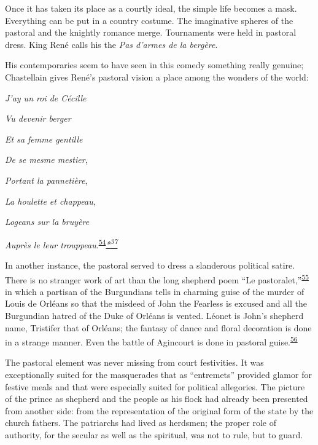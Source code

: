 Once it has taken its place as a courtly ideal, the simple life becomes
a mask. Everything can be put in a country costume. The imaginative
spheres of the pastoral and the knightly romance merge. Tournaments were
held in pastoral dress. King René calls his the \emph{Pas d'armes de la
bergère}.

His contemporaries seem to have seen in this comedy something really
genuine; Chastellain gives René's pastoral vision a place among the
wonders of the world:

\emph{J'ay un roi de Cécille}

\emph{Vu devenir berger}

\emph{\protect\hypertarget{11_Chapter_Four__THE_FORMS_OF_LOVE.xhtmlux5cux23page_152}{}{}Et
sa femme gentille}

\emph{De se mesme mestier},

\emph{Portant la pannetière},

\emph{La houlette et chappeau},

\emph{Logeans sur la bruyère}

\emph{Auprès le leur
trouppeau}.\textsuperscript{\protect\hypertarget{11_Chapter_Four__THE_FORMS_OF_LOVE.xhtmlux5cux23id_1381}{\protect\hyperlink{23_NOTES.xhtmlux5cux23id_1382}{54}}}\emph{\protect\hypertarget{11_Chapter_Four__THE_FORMS_OF_LOVE.xhtmlux5cux23id_2929}{\protect\hyperlink{23_NOTES.xhtmlux5cux23id_2930}{*\textsuperscript{37}}}}

In another instance, the pastoral served to dress a slanderous political
satire. There is no stranger work of art than the long shepherd poem
``Le
pastoralet,''\textsuperscript{\protect\hypertarget{11_Chapter_Four__THE_FORMS_OF_LOVE.xhtmlux5cux23id_1379}{\protect\hyperlink{23_NOTES.xhtmlux5cux23id_1380}{55}}}
in which a partisan of the Burgundians tells in charming guise of the
murder of Louis de Orléans so that the misdeed of John the Fearless is
excused and all the Burgundian hatred of the Duke of Orléans is vented.
Léonet is John's shepherd name, Tristifer that of Orléans; the fantasy
of dance and floral decoration is done in a strange manner. Even the
battle of Agincourt is done in pastoral
guise.\textsuperscript{\protect\hypertarget{11_Chapter_Four__THE_FORMS_OF_LOVE.xhtmlux5cux23id_1377}{\protect\hyperlink{23_NOTES.xhtmlux5cux23id_1378}{56}}}

The pastoral element was never missing from court festivities. It was
exceptionally suited for the masquerades that as ``entremets'' provided
glamor for festive meals and that were especially suited for political
allegories. The picture of the prince as shepherd and the people as his
flock had already been presented from another side: from the
representation of the original form of the state by the church fathers.
The patriarchs had lived as herdsmen; the proper role of authority, for
the secular as well as the spiritual, was not to rule, but to guard.

